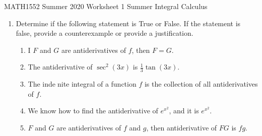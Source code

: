 \documentclass[12pt]{article}
\begin{document}
\noindent
MATH1552 Summer 2020
\hspace{2.2cm}
Worksheet 1 Summer
\hspace{2cm} Integral Calculus

\vspace{2mm}


\begin{enumerate}
    \item Determine if the following statement is True or False. If the statement is false, provide a counterexample or provide a justification. 
    \begin{enumerate}
        \item I $F$ and $G$ are antiderivatives of $f$, then $F=G$.
        
        
        \item The antiderivative of $\sec^2(3x)$ is $\frac{1}{3}\tan(3x)$.
        
        
        \item The indenite integral of a function $f$ is the collection of all antiderivatives of $f$.
        
        
        \item We know how to find the antiderivative of $e^{x^2}$, and it is $e^{x^2}$.

	\item $F$ and $G$ are antiderivatives of $f$ and $g$, then antiderivative of $FG$ is $fg$. 
        
        


\end{enumerate}
\end{enumerate}
\end{document}
